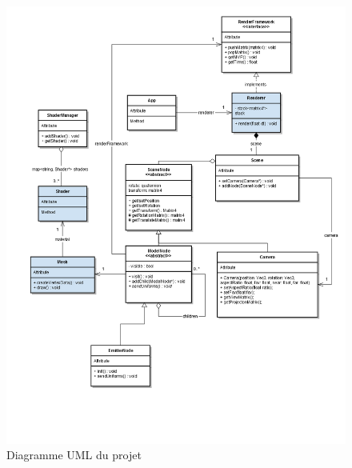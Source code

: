 \begin{figure}[h]
	\begin{center}
		\includegraphics[width=\textwidth]{img/UML.png}
	\end{center}
	\caption{Diagramme UML du projet}
\end{figure}

